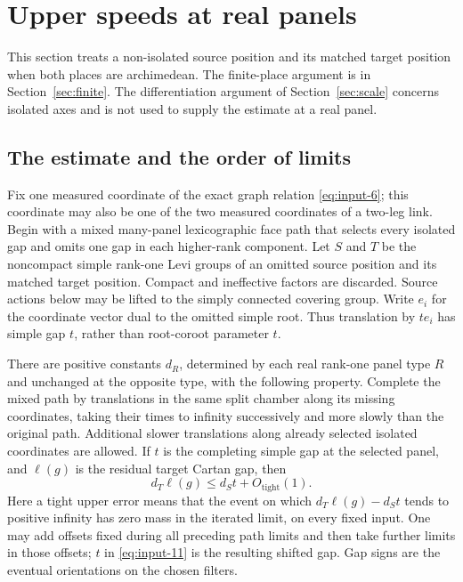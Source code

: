 \section{Upper speeds at real panels}\label{sec:panels}

This section treats a non-isolated source position and its matched target
position when both places are archimedean.  The finite-place argument is in
Section~\ref{sec:finite}.  The differentiation argument of
Section~\ref{sec:scale} concerns isolated axes and is not used to supply
the estimate at a real panel.

\subsection{The estimate and the order of limits}

Fix one measured coordinate of the exact graph relation
\eqref{eq:input-6}; this coordinate may also be one of the two measured
coordinates of a two-leg link.  Begin with a mixed many-panel
lexicographic face path that
selects every isolated gap and omits one gap in each higher-rank
component.  Let $S$ and $T$ be the noncompact simple rank-one Levi groups
of an omitted source position and its matched target position.  Compact
and ineffective factors are discarded.  Source actions below may be
lifted to the simply connected covering group.  Write $e_i$ for the
coordinate vector dual to the omitted simple root.  Thus translation by
$t e_i$ has simple gap $t$, rather than root-coroot parameter $t$.

\begin{proposition}\label{prop:panels-upper}
There are positive constants $d_R$, determined by each real rank-one
panel type $R$ and unchanged at the opposite type, with the following
property.  Complete the mixed path by translations in the same split
chamber along its missing coordinates, taking their times to infinity
successively and more slowly than the original path.  Additional slower
translations along already selected isolated coordinates are allowed.
If $t$ is the completing simple gap at the selected panel, and $\ell(g)$
is the residual target Cartan gap, then
\begin{equation}\label{eq:input-11}
 d_T\ell(g)\leq d_S t+O_{\mathrm{tight}}(1).
\end{equation}
Here a tight upper error means that the event on which
$d_T\ell(g)-d_St$ tends to positive infinity has zero mass in the
iterated limit, on every fixed input.  One may add offsets fixed during
all preceding path limits and then take further limits in those offsets;
$t$ in \eqref{eq:input-11} is the resulting shifted gap.  Gap signs are
the eventual orientations on the chosen filters.
\end{proposition}

